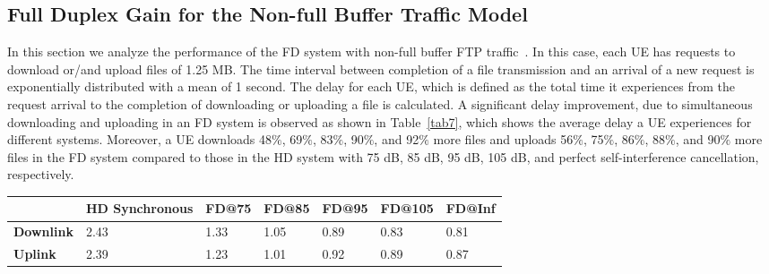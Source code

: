 \documentclass[journal]{IEEEtran}
\begin{document}
\subsection{Full Duplex Gain for the Non-full Buffer Traffic Model}\label{sec:NFT}
In this section we analyze the performance of the FD system with non-full buffer FTP traffic~\cite{3GPP:3}. In this case, each UE has requests to download or/and upload files of 1.25 MB. The time interval between completion of a file transmission and an arrival of a new request is exponentially distributed with a mean of 1 second. The delay for each UE, which is defined as the total time it experiences from the request arrival to the completion of downloading or uploading a file is calculated. A significant delay improvement, due to simultaneous downloading and uploading in an FD system is observed as shown in Table~\ref{tab7}, which shows the average delay a UE experiences for different systems. Moreover, a UE downloads 48$\%$, 69$\%$, 83$\%$, 90$\%$, and 92$\%$ more files and uploads 56$\%$, 75$\%$, 86$\%$, 88$\%$, and 90$\%$ more files in the FD system compared to those in the HD system with 75 dB, 85 dB, 95 dB, 105 dB, and perfect self-interference cancellation, respectively.

\begin {table*} 
\caption {Average delay (Seconds) in an indoor multi-cell scenario.} \label{tab7} 
\begin{center}
    \begin{tabular}{| l | l | l | l | l | l | l |}
    	\hline
		 & \textbf{HD Synchronous} & \textbf{FD@75} & \textbf{FD@85}  & \textbf{FD@95}  & \textbf{FD@105} & \textbf{FD@Inf} \\ \hline
		\textbf {Downlink} & 2.43 & 1.33 & 1.05 & 0.89 & 0.83 & 0.81 \\ \hline
		\textbf {Uplink}  & 2.39 & 1.23 & 1.01 & 0.92 & 0.89 & 0.87 \\ \hline		
    \end{tabular}
\end{center}
\end{table*}
\end{document}
